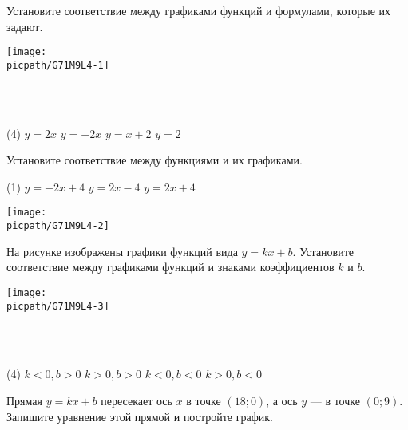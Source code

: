 \begin{class}[number=4]
	\begin{listofex}
		\item Установите соответствие между графиками функций и формулами, которые их задают.
		\begin{minipage}[t]{\linewidth}
			\texttt{[image: \\picpath/G71M9L4-1]}
		\end{minipage}
		\\
		\\
		\begin{minipage}[t]{\linewidth}
			\begin{tasks}(4)
				\task \( y=2x \)
				\task \( y=-2x \)
				\task \( y=x+2 \)
				\task \( y=2 \)
			\end{tasks}
		\end{minipage}
		
		\item 
		\begin{minipage}[t]{0.35\linewidth}
			Установите соответствие между функциями и их графиками.
			\begin{tasks}(1)
				\task \( y=-2x+4 \)
				\task \( y=2x-4 \)
				\task \( y=2x+4 \)
			\end{tasks}
		\end{minipage}
		\begin{minipage}[t]{0.6\linewidth}
			\texttt{[image: \\picpath/G71M9L4-2]}
		\end{minipage}
		
		\item На рисунке изображены графики функций вида \(y = kx + b\). Установите соответствие между графиками функций и знаками коэффициентов \(k\) и \(b\).
		\begin{minipage}[t]{\linewidth}
			\texttt{[image: \\picpath/G71M9L4-3]}
		\end{minipage}
		\\
		\\
		\begin{minipage}[t]{\linewidth}
			\begin{tasks}(4)
				\task \( k<0, b>0 \)
				\task \( k>0, b>0 \)
				\task \( k<0, b<0 \)
				\task \( k>0, b<0 \)
			\end{tasks}
		\end{minipage}
		
		\item Прямая \(y=kx+b\) пересекает ось \(x\) в точке \((18; 0)\), а ось \(y\) --- в точке \((0; 9)\). Запишите уравнение этой прямой и постройте график.
		

\end{listofex}
\end{class}
